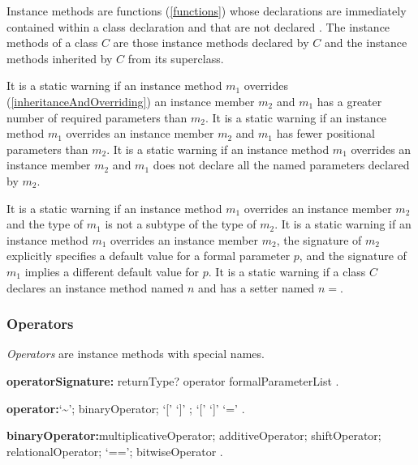 \documentclass{article}
\begin{document}
\LMHash{}
Instance methods are functions (\ref{functions}) whose declarations are immediately contained within a class declaration and that are not declared \STATIC{}. The instance methods of a class $C$ are those instance methods declared by $C$ and the instance methods inherited by $C$ from its superclass.


\LMHash{}
It is a static warning if an instance method $m_1$ overrides  (\ref{inheritanceAndOverriding}) an instance member $m_2$ and  $m_1$ has a greater number of required parameters than $m_2$. It is a static warning if an instance method $m_1$ overrides  an instance member $m_2$ and  $m_1$ has fewer positional parameters than $m_2$.  It is a static warning if an instance method $m_1$ overrides  an instance member $m_2$ and  $m_1$ does not declare all the named parameters declared by $m_2$.


\LMHash{}
It is a static warning if an instance method $m_1$ overrides an instance member $m_2$ and the type of $m_1$ is not a subtype of the type of $m_2$.
It is a static warning if an instance method $m_1$ overrides an instance member $m_2$, the signature of $m_2$ explicitly specifies a default value for a formal parameter $p$, and the signature of $m_1$ implies a different default value for $p$.
It is a static warning if a class $C$ declares an instance method named $n$ and has a setter named $n=$.


\subsubsection{Operators}

\LMHash{}
{\em Operators} are instance methods with special names.

\begin{grammar}
{\bf operatorSignature:}
       returnType? \OPERATOR{} operator formalParameterList
       .

 {\bf operator:}`\~{}';
      binaryOperator;
      `[' `]' ;
      `[' `]' `='
    .

{\bf binaryOperator:}multiplicativeOperator;
      additiveOperator;
      shiftOperator;
      relationalOperator;
      `==';
      bitwiseOperator
    .
 \end{grammar}
\end{document}
